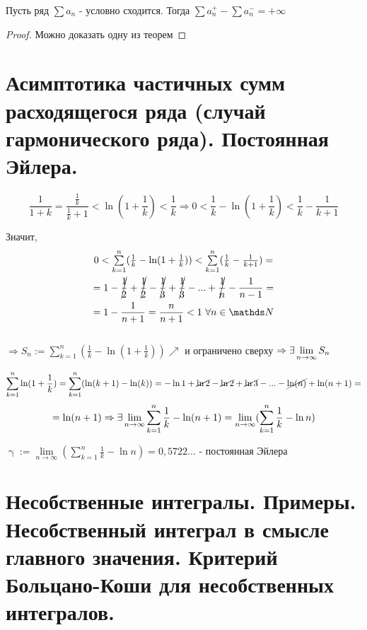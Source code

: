 \documentclass[12pt, fleqn]{article}
\begin{document}
\begin{Property}[3]
\begin{Property}[4]
\begin{Property}[2, аддитивность]
\begin{theorem} [Римана v2]
    Пусть ряд $\sum a_n$ - условно сходится. Тогда $\sum a_n^+ - \sum a_n^- = + \infty$
\end{theorem}

\begin{proof}
    Можно доказать одну из теорем
\end{proof}

\newpage
\section{Асимптотика частичных сумм расходящегося ряда (случай гармонического ряда). Постоянная Эйлера.}
 
\[\frac{1}{1+k} = \frac{\frac{1}{k}}{\frac{1}{k}+1} < \ln(1+\frac{1}{k}) < \frac{1}{k} \Rightarrow 0 < \frac{1}{k} - \ln(1+\frac{1}{k})< \frac{1}{k}-\frac{1}{k+1}\]

Значит, \begin{multline*}
    $$0 < \sum\limits_{k=1}^n (\frac{1}{k} - \ln(1+\frac{1}{k})) < \sum\limits_{k=1}^n (\frac{1}{k} - \frac{1}{k+1}) = \\
    =1 - \cancel{\frac{1}{2}} + \cancel{\frac{1}{2}} - \cancel{\frac{1}{3}} + \cancel{\frac{1}{3}} -...+ \cancel{\frac{1}{n}} - \frac{1}{n-1} =\\
    =1 - \frac{1}{n+1} = \frac{n}{n+1} < 1\ \forall n \in \N$$
\end{multline*}
\\
$\Rightarrow S_n := \sum\limits_{k=1}^n (\frac{1}{k} - \ln(1+\frac{1}{k})) \nearrow$ и ограничено сверху $\Rightarrow \exists \lim\limits_{n \rightarrow \infty} S_n$

$$\sum\limits_{k=1}^n \ln (1+ \frac{1}{k}) = \sum\limits_{k=1}^n (\ln(k+1) - \ln(k)) = -\ln1+\cancel{\ln2}-\cancel{\ln2}+\cancel{\ln3}-...-\cancel{\ln (n)}+ \ln (n+1) =$$
$$ =\ln (n+1) \Rightarrow \exists \lim\limits_{n \rightarrow \infty} \sum\limits_{k=1}^n \frac{1}{k} - \ln (n+1) = \lim\limits_{n \rightarrow \infty} (\sum\limits_{k=1}^n \frac{1}{k} - \ln n)$$

\begin{definition}
    $\upgamma := \lim\limits_{n \rightarrow \infty} (\sum\limits_{k=1}^n \frac{1}{k} - \ln n) = 0,5722...$ - постоянная Эйлера
\end{definition}

\newpage
\section{Несобственные интегралы. Примеры. Несобственный интеграл в смысле главного значения. Критерий Больцано-Коши для несобственных интегралов.}


\end{Property}
\end{Property}
\end{Property}
\end{document}
